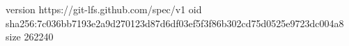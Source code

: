 version https://git-lfs.github.com/spec/v1
oid sha256:7c036bb7193e2a9d270123d87d6df03ef5f3f86b302cd75d0525e9723dc004a8
size 262240
